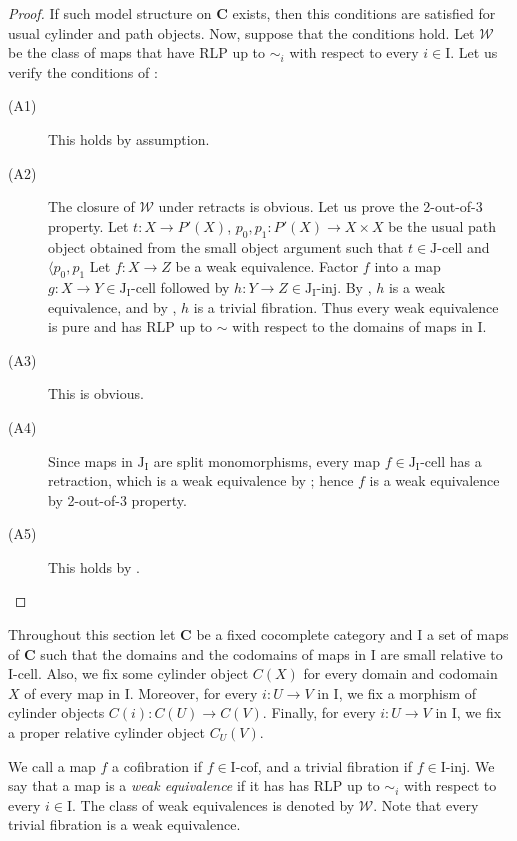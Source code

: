 \documentclass{amsart}
\theoremstyle{definition}
\newcommand{\we}{\mathcal{W}}
\newcommand{\cat}[1]{\mathbf{#1}}
\newcommand{\C}{\cat{C}}
\newcommand{\I}{\mathrm{I}}
\newcommand{\J}{\mathrm{J}}
\newcommand{\class}[2]{#1\text{-}\mathrm{#2}}
\newcommand{\Iinj}[1][\I]{\class{#1}{inj}}
\newcommand{\Icell}[1][\I]{\class{#1}{cell}}
\newcommand{\Icof}[1][\I]{\class{#1}{cof}}
\newcommand{\Jinj}[1][]{\Iinj[\J#1]}
\newcommand{\Jcell}[1][]{\Icell[\J#1]}
\begin{document}
\begin{proof}
If such model structure on $\C$ exists, then this conditions are satisfied for usual cylinder and path objects.
Now, suppose that the conditions hold.
Let $\we$ be the class of maps that have RLP up to $\sim_i$ with respect to every $i \in \I$.
Let us verify the conditions of :
\begin{description}
\item[(A1)] This holds by assumption.
\item[(A2)] The closure of $\we$ under retracts is obvious.
Let us prove the 2-out-of-3 property.
Let $t : X \to P'(X)$, $p_0,p_1 : P'(X) \to X \times X$ be the usual path object obtained from the small object argument
such that $t \in \Jcell$ and $\langle p_0, p_1$
Let $f : X \to Z$ be a weak equivalence.
Factor $f$ into a map $g : X \to Y \in \Jcell[_\I]$ followed by $h : Y \to Z \in \Jinj[_\I]$.
By , $h$ is a weak equivalence, and by , $h$ is a trivial fibration.
Thus every weak equivalence is pure and has RLP up to $\sim$ with respect to the domains of maps in $\I$.
\item[(A3)] This is obvious.
\item[(A4)] Since maps in $\J_\I$ are split monomorphisms, every map
$f \in \Jcell[_\I]$ has a retraction, which is a weak equivalence by
; hence $f$ is a weak equivalence by 2-out-of-3 property.
\item[(A5)] This holds by .
\end{description}
\end{proof}

Throughout this section let $\C$ be a fixed cocomplete category and $\I$ a set of maps of $\C$
such that the domains and the codomains of maps in $\I$ are small relative to $\Icell$.
Also, we fix some cylinder object $C(X)$ for every domain and codomain $X$ of every map in $\I$.
Moreover, for every $i : U \to V$ in $\I$, we fix a morphism of cylinder objects $C(i) : C(U) \to C(V)$.
Finally, for every $i : U \to V$ in $\I$, we fix a proper relative cylinder object $C_U(V)$.

We call a map $f$ a cofibration if $f \in \Icof$, and a trivial fibration if $f \in \Iinj$.
We say that a map is a \emph{weak equivalence} if it has has RLP up to $\sim_i$ with respect to every $i \in \I$.
The class of weak equivalences is denoted by $\we$.
Note that every trivial fibration is a weak equivalence.
\end{document}
